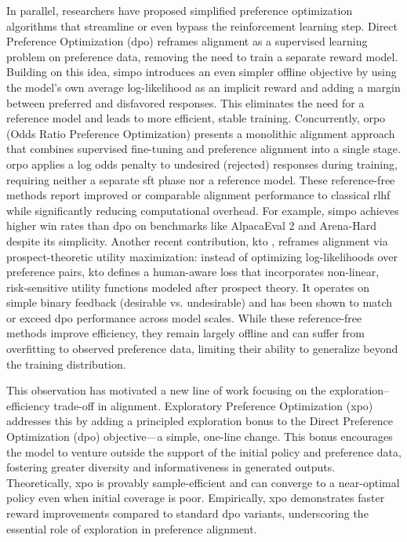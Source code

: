 In parallel, researchers have proposed simplified preference optimization algorithms that streamline or even bypass the reinforcement learning step. Direct Preference Optimization (\gls{dpo}) \citep{rafailov2023dpo} reframes alignment as a supervised learning problem on preference data, removing the need to train a separate reward model. Building on this idea, \gls{simpo} \citep{meng2024simpo} introduces an even simpler offline objective by using the model’s own average log-likelihood as an implicit reward and adding a margin between preferred and disfavored responses. This eliminates the need for a reference model and leads to more efficient, stable training. Concurrently, \gls{orpo} \citep{hong2024orpo} (Odds Ratio Preference Optimization) presents a monolithic alignment approach that combines supervised fine-tuning and preference alignment into a single stage. \gls{orpo} applies a log odds penalty to undesired (rejected) responses during training, requiring neither a separate \gls{sft} phase nor a reference model. These reference-free methods report improved or comparable alignment performance to classical \gls{rlhf} while significantly reducing computational overhead. For example, \gls{simpo} achieves higher win rates than \gls{dpo} on benchmarks like AlpacaEval 2 and Arena-Hard despite its simplicity.
Another recent contribution, \gls{kto} \cite{ethayarajh2024kto}, reframes alignment via prospect-theoretic utility maximization: instead of optimizing log-likelihoods over preference pairs, \gls{kto} defines a human-aware loss that incorporates non‑linear, risk‑sensitive utility functions modeled after prospect theory. It operates on simple binary feedback (desirable vs. undesirable) and has been shown to match or exceed \gls{dpo} performance across model scales. While these reference-free methods improve efficiency, they remain largely offline and can suffer from overfitting to observed preference data, limiting their ability to generalize beyond the training distribution.

This observation has motivated a new line of work focusing on the exploration–efficiency trade-off in alignment. Exploratory Preference Optimization (\gls{xpo}) \citep{xie2024xpo} addresses this by adding a principled exploration bonus to the Direct Preference Optimization (\gls{dpo}) objective—a simple, one-line change. This bonus encourages the model to venture outside the support of the initial policy and preference data, fostering greater diversity and informativeness in generated outputs. Theoretically, \gls{xpo} is provably sample-efficient and can converge to a near-optimal policy even when initial coverage is poor. Empirically, \gls{xpo} demonstrates faster reward improvements compared to standard \gls{dpo} variants, underscoring the essential role of exploration in preference alignment.

